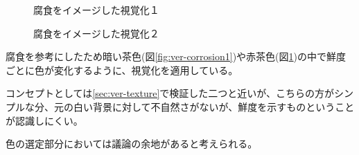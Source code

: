 \begin{figure}[htbp]
  \begin{minipage}{0.5\hsize}
    \begin{center}
    \end{center}
    \caption{腐食をイメージした視覚化１}
    \label{fig:ver-corrosion1}
  \end{minipage}
  \begin{minipage}{0.5\hsize}
    \begin{center}
    \end{center}
    \caption{腐食をイメージした視覚化２}
    \label{fig:ver-corrosion2}
  \end{minipage}
\end{figure}

腐食を参考にしたため暗い茶色(図\ref{fig:ver-corrosion1})や赤茶色(図\ref{fig:ver-corrosion2})の中で鮮度ごとに色が変化するように、視覚化を適用している。

コンセプトとしては\ref{sec:ver-texture}で検証した二つと近いが、こちらの方がシンプルな分、元の白い背景に対して不自然さがないが、鮮度を示すものということが認識しにくい。

色の選定部分においては議論の余地があると考えられる。

